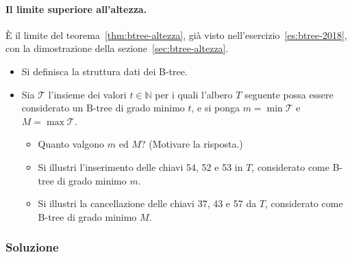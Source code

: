 \paragraph{Il limite superiore all'altezza.}
È il limite del teorema~\ref{thm:btree-altezza}, già visto nell'esercizio~\ref{es:btree-2018}, con la dimostrazione della sezione~\ref{sec:btree-altezza}.

\begin{esercizio}\label{es:btree-2023}
\begin{itemize}
    \item[(a)] Si definisca la struttura dati dei B-tree.
    \item[(b)] Sia $\mathcal{T}$ l'insieme dei valori $t \in \mathbb{N}$ per i quali l'albero $T$ seguente possa essere considerato un B-tree di grado minimo $t$, e si ponga $m = \min \mathcal{T}$ e $M = \max \mathcal{T}$.
    \begin{itemize}
        \item[(b.1)] Quanto valgono $m$ ed $M$? (Motivare la risposta.)
        \item[(b.2)] Si illustri l'inserimento delle chiavi 54, 52 e 53 in $T$, considerato come B-tree di grado minimo $m$.
        \item[(b.3)] Si illustri la cancellazione delle chiavi 37, 43 e 57 da $T$, considerato come B-tree di grado minimo $M$.
    \end{itemize}
\end{itemize}
\begin{center}
\end{center}
\end{esercizio}

\subsubsection*{Soluzione}

